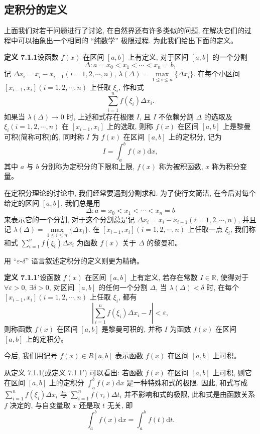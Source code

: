 \documentclass[UTF8,12pt,a4paper,fontset=fandol]{ctexart}
\begin{document}
\subsection{定积分的定义}

上面我们对若干问题进行了讨论, 在自然界还有许多类似的问题, 在解决它们的过程中可以抽象出一个相同的 ``纯数学'' 极限过程. 为此我们给出下面的定义。

\noindent\textbf{定义 7.1.1}\quad 设函数 $f(x)$ 在区间 $[a,b]$ 上有定义, 对于区间 $[a,b]$ 的一个分割
\[
  \Delta:a=x_0<x_1<\cdots<x_n=b,
\]
记 $\Delta x_i=x_i-x_{i-1}(i=1,2,\cdots,n)$, $\lambda(\Delta)=\max\limits_{1\leq i\leq n}\{\Delta x_i\}$. 在每个小区间 $[x_{i-1},x_i](i=1,2,\cdots,n)$ 上任取 $\xi_i$, 作和式
\[
  \sum_{i=1}^n f(\xi_i)\Delta x_i.
\]
如果当 $\lambda(\Delta)\to0$ 时, 上述和式存在极限 $I$, 且 $I$ 不依赖分割 $\Delta$ 的选取及 $\xi_i(i=1,2,\cdots,n)$ 在 $[x_{i-1},x_i]$ 上的选取, 则称 $f(x)$ 在区间 $[a,b]$ 上是黎曼可积(简称可积)的, 同时称 $I$ 为 $f(x)$ 在区间 $[a,b]$ 上的定积分, 记为
\[
  I=\int_a^b f(x)\mathrm dx,
\]
其中 $a$ 与 $b$ 分别称为定积分的下限和上限, $f(x)$ 称为被积函数, $x$ 称为积分变量。

在定积分理论的讨论中, 我们经常要遇到分割求和. 为了使行文简洁, 在今后对每个给定的区间 $[a,b]$, 我们总是用
\[
  \Delta:a=x_0<x_1<\cdots<x_n=b
\]
来表示它的一个分割, 对于这个分割总是记 $\Delta x_i=x_i-x_{i-1}(i=1,2,\cdots,n)$, 并且记 $\lambda(\Delta)=\max\limits_{1\leq i\leq n}\{\Delta x_i\}$. 在 $[x_{i-1},x_i](i=1,2,\cdots,n)$ 上任取一点 $\xi_i$, 我们称和式 $\sum\limits_{i=1}^n f(\xi_i)\Delta x_i$ 为函数 $f(x)$ 关于 $\Delta$ 的黎曼和。

用 ``$\varepsilon$-$\delta$'' 语言叙述定积分的定义则更为精确。

\noindent\textbf{定义 7.1.1'}\quad 设函数 $f(x)$ 在区间 $[a,b]$ 上有定义, 若存在常数 $I\in\mathbb R$, 使得对于 $\forall\varepsilon>0$, $\exists\delta>0$, 对区间 $[a,b]$ 的任何一个分割 $\Delta$, 当 $\lambda(\Delta)<\delta$ 时, 在每个 $[x_{i-1},x_i](i=1,2,\cdots,n)$ 上任取 $\xi_i$, 都有
\[
  \left|\sum_{i=1}^n f(\xi_i)\Delta x_i-I\right|<\varepsilon,
\]
则称函数 $f(x)$ 在区间 $[a,b]$ 是黎曼可积的, 并称 $I$ 为函数 $f(x)$ 在区间 $[a,b]$ 上的定积分。

今后, 我们用记号 $f(x)\in R[a,b]$ 表示函数 $f(x)$ 在区间 $[a,b]$ 上可积。

从定义 7.1.1(或定义 7.1.1') 可以看出: 若函数 $f(x)$ 在区间 $[a,b]$ 上可积, 则它在区间 $[a,b]$ 上的定积分 $\int_a^b f(x)\mathrm dx$ 是一种特殊和式的极限. 因此, 和式写成 $\sum\limits_{i=1}^n f(\xi_i)\Delta x_i$ 与 $\sum\limits_{i=1}^n f(\tau_i)\Delta t_i$ 并不影响和式的极限, 此和式是由函数关系 $f$ 决定的, 与自变量取 $x$ 还是取 $t$ 无关, 即
\[
  \int_a^b f(x)\mathrm dx=\int_a^b f(t)\mathrm dt.
\]
\end{document}
